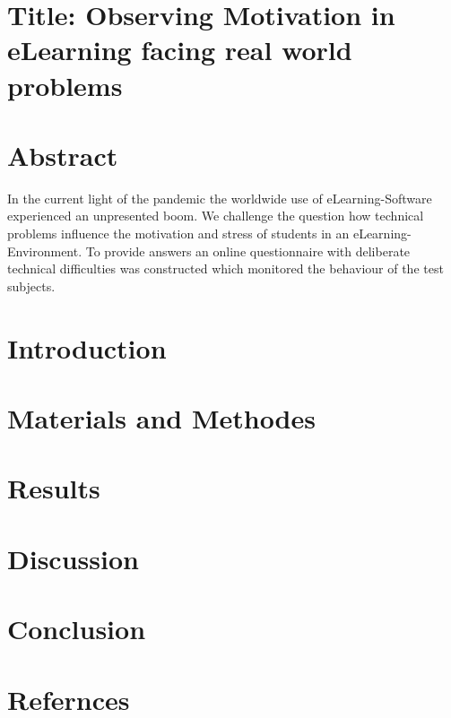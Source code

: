 \documentclass[12pt, a4paper]{article}
\begin{document}
    \tableofcontents
    
\section{Title: Observing Motivation in eLearning facing real world problems}

\section{Abstract}
In the current light of the pandemic the worldwide use of eLearning-Software experienced an unpresented boom.  We challenge the question how technical problems influence the motivation and stress of students in an eLearning-Environment. To provide answers an online questionnaire with deliberate technical difficulties was constructed which monitored the behaviour of the test subjects.

\section{Introduction}
\section{Materials and Methodes}
\section{Results}
\section{Discussion}
\section{Conclusion}
\section{Refernces}
\end{document}
